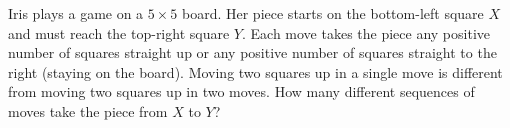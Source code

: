 Iris plays a game on a $5\times5$ board. Her piece starts on the bottom-left square $X$ and must reach the top-right square $Y$. Each move takes the piece any positive number of squares straight up or any positive number of squares straight to the right (staying on the board). Moving two squares up in a single move is different from moving two squares up in two moves. How many different sequences of moves take the piece from $X$ to $Y$?
